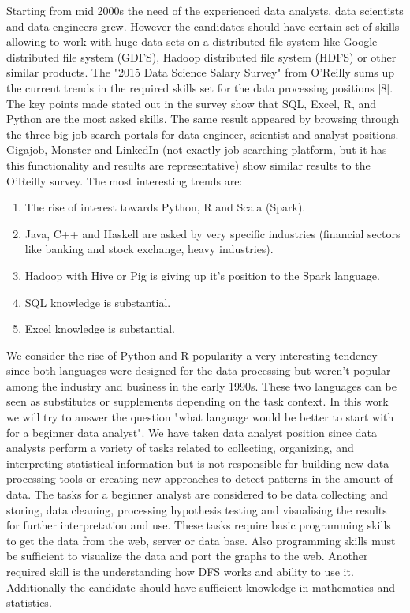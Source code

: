 \documentclass [twoside,
  11pt, a4paper,
  footinclude=true,
  headinclude=true,
  cleardoublepage=empty
]{article}
\begin{document}
Starting from mid 2000s the need of the experienced data analysts, data scientists and data engineers grew. However the candidates should have certain set of skills allowing to work with huge data sets on a distributed file system like Google distributed file system (GDFS), Hadoop distributed file system (HDFS) or other similar products. The "2015 Data Science Salary Survey" from O'Reilly sums up the current trends in the required skills set for the data processing positions [8]. The key points made stated out in the survey show that SQL, Excel, R, and Python are the most asked skills. The same result appeared by browsing through the three big job search portals for data engineer, scientist and analyst positions. Gigajob, Monster and LinkedIn (not exactly job searching  platform, but it has this functionality and results are representative) show similar results to the O'Reilly survey. The most interesting trends are:
\begin{enumerate}
    \item The rise of interest towards Python, R and Scala (Spark).
    \item Java, C++ and Haskell are asked by very specific industries (financial sectors like banking and stock exchange, heavy industries).
    \item Hadoop with Hive or Pig is giving up it's position to the Spark language.
    \item SQL knowledge is substantial.
    \item Excel knowledge is substantial.
\end{enumerate}
We consider the rise of Python and R popularity a very interesting tendency since both languages were designed for the data processing but weren't popular among the industry and business in the early 1990s. These two languages can be seen as substitutes or supplements depending on the task context. In this work we will try to answer the question "what language would be better to start with for a beginner data analyst". We have taken data analyst position since data analysts perform a variety of tasks related to collecting, organizing, and interpreting statistical information but is not responsible for building new data processing tools or creating new approaches to detect patterns in the amount of data. The tasks for a beginner analyst are considered to be data collecting and storing, data cleaning, processing hypothesis testing and visualising the results for further interpretation and use. These tasks require basic programming skills to get the data from the web, server or data base. Also programming skills must be sufficient to visualize the data and port the graphs to the web. Another required skill is the understanding how DFS works and ability to use it. Additionally the candidate should have sufficient knowledge in mathematics and statistics.
\end{document}
